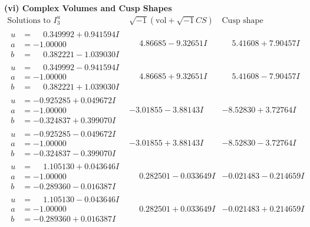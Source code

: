 \documentclass[1p]{elsarticle_modified}
\theoremstyle{definition}
\newcommand{\I}{\sqrt{-1}}
\begin{document}
\newpage\flushleft \textbf{(vi) Complex Volumes and Cusp Shapes}
$$\begin{array}{c|c|c}  
\text{Solutions to }I^u_{3}& \I (\text{vol} + \sqrt{-1}CS) & \text{Cusp shape}\\
 \hline 
\begin{aligned}
u &= \phantom{-}0.349992 + 0.941594 I \\
a &= -1.00000\phantom{ +0.000000I} \\
b &= \phantom{-}0.382221 - 1.039030 I\end{aligned}
 & \phantom{-}4.86685 - 9.32651 I & \phantom{-}5.41608 + 7.90457 I \\ \hline\begin{aligned}
u &= \phantom{-}0.349992 - 0.941594 I \\
a &= -1.00000\phantom{ +0.000000I} \\
b &= \phantom{-}0.382221 + 1.039030 I\end{aligned}
 & \phantom{-}4.86685 + 9.32651 I & \phantom{-}5.41608 - 7.90457 I \\ \hline\begin{aligned}
u &= -0.925285 + 0.049672 I \\
a &= -1.00000\phantom{ +0.000000I} \\
b &= -0.324837 + 0.399070 I\end{aligned}
 & -3.01855 - 3.88143 I & -8.52830 + 3.72764 I \\ \hline\begin{aligned}
u &= -0.925285 - 0.049672 I \\
a &= -1.00000\phantom{ +0.000000I} \\
b &= -0.324837 - 0.399070 I\end{aligned}
 & -3.01855 + 3.88143 I & -8.52830 - 3.72764 I \\ \hline\begin{aligned}
u &= \phantom{-}1.105130 + 0.043646 I \\
a &= -1.00000\phantom{ +0.000000I} \\
b &= -0.289360 - 0.016387 I\end{aligned}
 & \phantom{-}0.282501 - 0.033649 I & -0.021483 - 0.214659 I \\ \hline\begin{aligned}
u &= \phantom{-}1.105130 - 0.043646 I \\
a &= -1.00000\phantom{ +0.000000I} \\
b &= -0.289360 + 0.016387 I\end{aligned}
 & \phantom{-}0.282501 + 0.033649 I & -0.021483 + 0.214659 I \\ \hline\begin{aligned}

\end{aligned}
\end{array}$$
\end{document}
